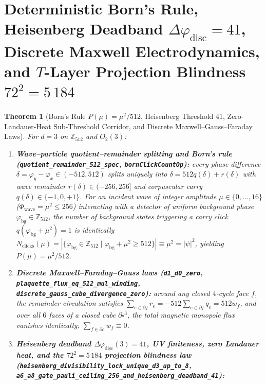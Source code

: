 \documentclass[11pt,a4paper]{article}
\theoremstyle{plain}
\newtheorem{theorem}{Theorem}[section]
\theoremstyle{definition}
\begin{document}
\section{Deterministic Born's Rule, Heisenberg Deadband \texorpdfstring{$\Delta\varphi_{\mathrm{disc}}=41$}{dphi=41}, Discrete Maxwell Electrodynamics, and \texorpdfstring{$T$}{T}-Layer Projection Blindness \texorpdfstring{$72^2=5\,184$}{72^2=5184}}
\label{sec:born-maxwell-heisenberg}

\begin{theorem}[Born's Rule $P(\mu)=\mu^2/512$, Heisenberg Threshold $41$, Zero-Landauer-Heat Sub-Threshold Corridor, and Discrete Maxwell--Gauss--Faraday Laws]
\label{thm:born-heisenberg-maxwell}
For $d=3$ on $\mathbb{Z}_{512}$ and $O_2(3)$:
\begin{enumerate}[label=\textbf{(\roman*)},leftmargin=*]
\item \textbf{Wave--particle quotient--remainder splitting and Born's rule (\texttt{quotient\_remainder\_512\_spec}, \texttt{bornClickCountOp}):}
  every phase difference $\delta = \varphi_y - \varphi_x\in(-512,512)$ splits uniquely into $\delta = 512 q(\delta) + r(\delta)$ with wave remainder $r(\delta)\in(-256,256]$ and corpuscular carry $q(\delta)\in\{-1,0,+1\}$. For an incident wave of integer amplitude $\mu\in\{0,\dots,16\}$ ($\Phi_{\mathrm{wave}} = \mu^2\le 256$) interacting with a detector of uniform background phase $\varphi_{\mathrm{bg}}\in\mathbb{Z}_{512}$, the number of background states triggering a carry click $q(\varphi_{\mathrm{bg}}+\mu^2)=1$ is identically $N_{\mathrm{clicks}}(\mu) = |\{\varphi_{\mathrm{bg}}\in\mathbb{Z}_{512}\mid \varphi_{\mathrm{bg}}+\mu^2\ge 512\}| \equiv \mu^2 = |\psi|^2$, yielding $P(\mu) = \mu^2/512$.
\item \textbf{Discrete Maxwell--Faraday--Gauss laws (\texttt{d1\_d0\_zero}, \texttt{plaquette\_flux\_eq\_512\_mul\_winding}, \texttt{discrete\_gauss\_cube\_divergence\_zero}):}
  around any closed $4$-cycle face $f$, the remainder circulation satisfies $\sum_{e\in\partial f} r_e = -512\sum_{e\in\partial f} q_e = 512 w_f$, and over all $6$ faces of a closed cube $\partial\square^3$, the total magnetic monopole flux vanishes identically: $\sum_{f\in\partial c} w_f \equiv 0$.
\item \textbf{Heisenberg deadband $\Delta\varphi_{\mathrm{disc}}(3)=41$, UV finiteness, zero Landauer heat, and the $72^2=5\,184$ projection blindness law (\texttt{heisenberg\_divisibility\_lock\_unique\_d3\_up\_to\_8}, \texttt{a6\_a8\_gate\_pauli\_ceiling\_256\_and\_heisenberg\_deadband\_41}):}

\end{enumerate}
\end{theorem}
\end{document}
